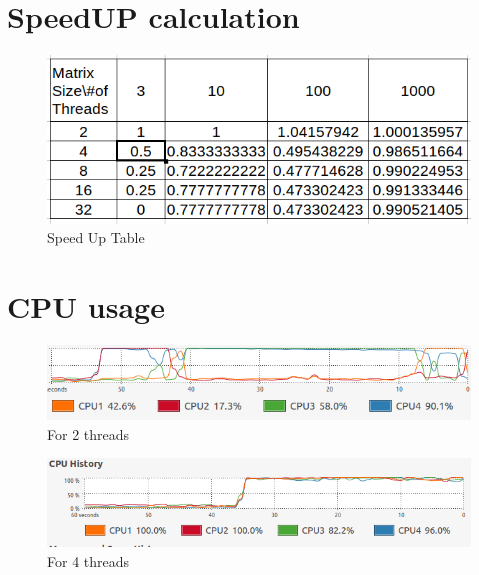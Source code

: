 \documentclass{sem5}
\begin{document}
\section{SpeedUP calculation}
\begin{figure}[!htp]
\centering
\includegraphics[scale=.4]{su.png}
\caption{Speed Up Table}
\end{figure}


\section{CPU usage}
\begin{figure}[!htp]
\centering
\includegraphics[scale=.4]{thr2.png}
\caption{For 2 threads}
\end{figure}
\begin{figure}[!htp]
\centering
\includegraphics[scale=.4]{thr_4.png}
\caption{For 4 threads}
\end{figure}

\newpage
\end{document}
